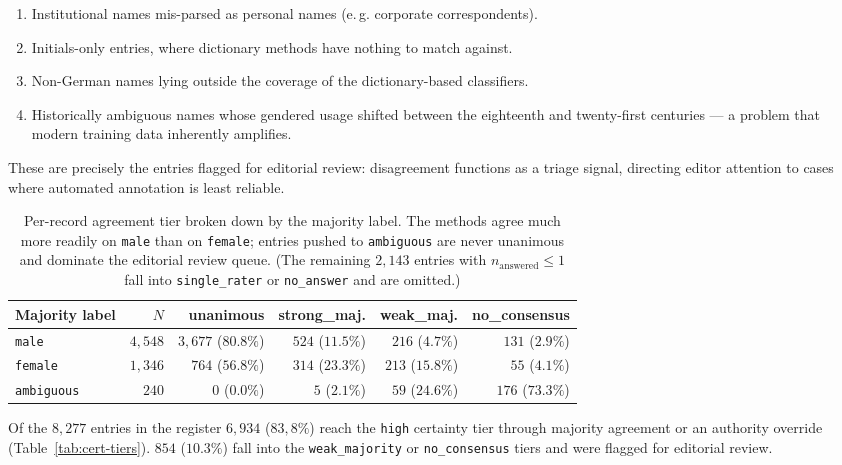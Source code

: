 \documentclass{eceasst}
\newcommand{\eg}{e.\,g.}
\begin{document}
\begin{enumerate}
  \item Institutional names mis-parsed as personal names (\eg{} corporate correspondents).
  \item Initials-only entries, where dictionary methods have nothing to match against.
  \item Non-German names lying outside the coverage of the dictionary-based classifiers.
  \item Historically ambiguous names whose gendered usage shifted between the eighteenth and twenty-first centuries --- a problem that modern training data inherently amplifies.
\end{enumerate}

These are precisely the entries flagged for editorial review: disagreement functions as a triage signal, directing editor attention to cases where automated annotation is least reliable.

\begin{table}[h]
  \centering
  \small
  \begin{tabular}{lrrrrr}
    \toprule
    Majority label & $N$ & unanimous & strong\_maj. & weak\_maj. & no\_consensus \\
    \midrule
    \texttt{male}      & $4{,}548$ & $3{,}677$ ($80.8\%$) & $524$ ($11.5\%$) & $216$ ($4.7\%$) & $131$ ($2.9\%$) \\
    \texttt{female}    & $1{,}346$ & $764$ ($56.8\%$)     & $314$ ($23.3\%$) & $213$ ($15.8\%$) & $55$ ($4.1\%$)  \\
    \texttt{ambiguous} & $240$     & $0$ ($0.0\%$)        & $5$ ($2.1\%$)    & $59$ ($24.6\%$)  & $176$ ($73.3\%$) \\
    \bottomrule
  \end{tabular}
  \caption{Per-record agreement tier broken down by the majority label. The methods agree much more readily on \texttt{male} than on \texttt{female}; entries pushed to \texttt{ambiguous} are never unanimous and dominate the editorial review queue. (The remaining $2{,}143$ entries with $n_{\text{answered}} \le 1$ fall into \texttt{single\_rater} or \texttt{no\_answer} and are omitted.)}
  \label{tab:tier-by-label}
\end{table}



Of the $8{,}277$ entries in the register $6{,}934$ ($83,8\%$) reach the \texttt{high} certainty tier through majority agreement or an authority override (Table~\ref{tab:cert-tiers}).  $854$ ($10.3\%$) fall into the \texttt{weak\_majority} or \texttt{no\_consensus} tiers and were flagged for editorial review. 
\end{document}
